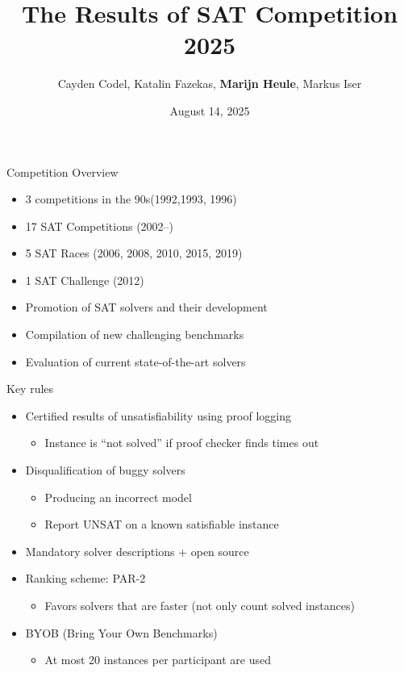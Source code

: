 \documentclass{beamer}
\title[SAT Competition 2023]{{\bf The Results of SAT Competition 2025}%
}
\author[Codel, Fazekas, Heule, Iser] {Cayden Codel, Katalin Fazekas, {\bf Marijn Heule},
{Markus Iser}}
\institute[] %
{\Large 
SAT 2025 Conference, Glasgow, Scotland \\ %
}
\date{August 14, 2025} %
\begin{document}
\begin{frame}
\titlepage %
\end{frame}

\begin{frame}{Competition Overview}

\begin{itemize}
\item 3 competitions in the 90s\hfill (1992,1993, 1996)
\item 17 SAT Competitions \hfill (2002--)
\item 5 SAT Races \hfill (2006, 2008, 2010, 2015, 2019)
\item 1 SAT Challenge \hfill (2012)
\end{itemize}

\bigskip
\bigskip

\begin{itemize}
\item Promotion of SAT solvers and their development
\item Compilation of new challenging benchmarks
\item Evaluation of current state-of-the-art solvers
\end{itemize}

\end{frame}


\begin{frame}{Key rules}
\begin{itemize}
\item Certified results of unsatisfiability using proof logging
  \begin{itemize}
  \item Instance is ``not solved'' if proof checker finds times out
  \end{itemize}
\medskip
\item Disqualification of buggy solvers
  \begin{itemize}
  \item Producing an incorrect model
  \item Report UNSAT on a known satisfiable instance
  \end{itemize}
\medskip
\item Mandatory solver descriptions + open source
\medskip
\item Ranking scheme: PAR-2
\begin{itemize}
\item Favors solvers that are faster (not only count solved instances)
\end{itemize}
\medskip
\item BYOB (Bring Your Own Benchmarks)
\begin{itemize}
\item At most 20 instances per participant are used
\end{itemize} 
\end{itemize}
\end{frame}
\end{document}
